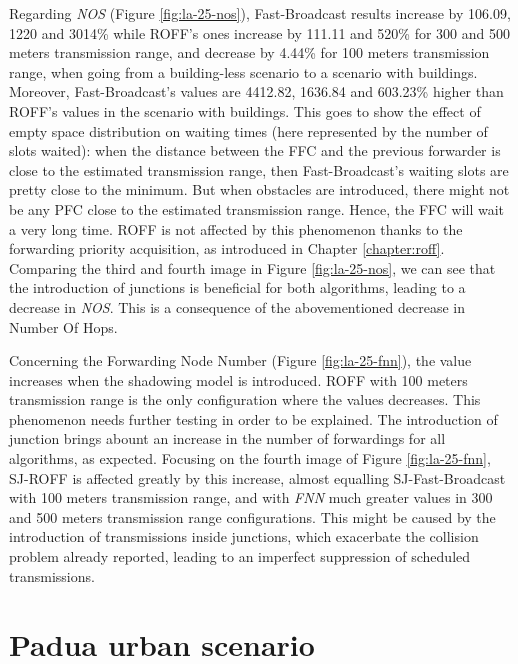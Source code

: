 		
		Regarding \textit{NOS} (Figure \ref{fig:la-25-nos}), Fast-Broadcast results increase by 106.09, 1220 and 3014\% while ROFF's ones increase by 111.11 and 520\% for 300 and 500 meters transmission range, and decrease by 4.44\% for 100 meters transmission range, when going from a building-less scenario to a scenario with buildings. Moreover, Fast-Broadcast's values are 4412.82, 1636.84 and 603.23\% higher than ROFF's values in the scenario with buildings. This goes to show the effect of empty space distribution on waiting times (here represented by the number of slots waited): when the distance between the FFC and the previous forwarder is close to the estimated transmission range, then Fast-Broadcast's waiting slots are pretty close to the minimum. But when obstacles are introduced, there might not be any PFC close to the estimated transmission range. Hence, the FFC will wait a very long time. ROFF is not affected by this phenomenon thanks to the forwarding priority acquisition, as introduced in Chapter \ref{chapter:roff}. Comparing the third and fourth image in Figure \ref{fig:la-25-nos}, we can see that the introduction of junctions is beneficial for both algorithms, leading to a decrease in \textit{NOS}. This is a consequence of the abovementioned decrease in Number Of Hops.
		
			
		Concerning the Forwarding Node Number (Figure \ref{fig:la-25-fnn}), the value increases when the shadowing model is introduced. ROFF with 100 meters transmission range is the only configuration where the values decreases. This phenomenon needs further testing in order to be explained. %
		The introduction of junction brings abount an increase in the number of forwardings for all algorithms, as expected. Focusing on the fourth image of Figure \ref{fig:la-25-fnn}, SJ-ROFF is affected greatly by this increase, almost equalling SJ-Fast-Broadcast with 100 meters transmission range, and with \textit{FNN} much greater values in 300 and 500 meters transmission range configurations. This might be caused by the introduction of transmissions inside junctions, which exacerbate the collision problem already reported, leading to an imperfect suppression of scheduled transmissions. 
	
	\section{Padua urban scenario}

